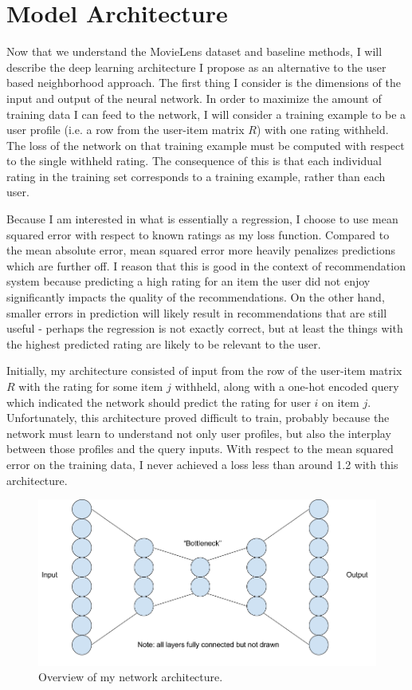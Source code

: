 \documentclass[12pt]{article}
\begin{document}
\section{Model Architecture}
\label{sec:arch}

Now that we understand the MovieLens dataset and baseline methods, I will
describe the deep learning architecture I propose as an alternative to the
user based neighborhood approach.
The first thing I consider is the dimensions of the input and output of the
neural network.
In order to maximize the amount of training data I can feed to the network, I
will consider a training example to be a user profile (i.e. a row from the
user-item matrix $R$) with one rating withheld.
The loss of the network on that training example must be computed with respect
to the single withheld rating.
The consequence of this is that each individual rating in the training set
corresponds to a training example, rather than each user.

Because I am interested in what is essentially a regression, I choose to use
mean squared error with respect to known ratings as my loss function.
Compared to the mean absolute error, mean squared error more heavily penalizes
predictions which are further off.
I reason that this is good in the context of recommendation system because
predicting a high rating for an item the user did not enjoy significantly
impacts the quality of the recommendations.
On the other hand, smaller errors in prediction will likely result in
recommendations that are still useful - perhaps the regression is not
exactly correct, but at least the things with the highest predicted rating are
likely to be relevant to the user.

Initially, my architecture consisted of input from the row of the user-item
matrix $R$ with the rating for some item $j$ withheld, along with a one-hot
encoded query which indicated the network should predict the rating for user
$i$ on item $j$.
Unfortunately, this architecture proved difficult to train, probably because
the network must learn to understand not only user profiles, but also the
interplay between those profiles and the query inputs.
With respect to the mean squared error on the training data, I never achieved
a loss less than around 1.2 with this architecture.

\begin{figure}
\centering
\includegraphics[width=.5\textwidth]{arch}
\caption{Overview of my network architecture.}
\label{fig:arch}
\end{figure}
\end{document}
